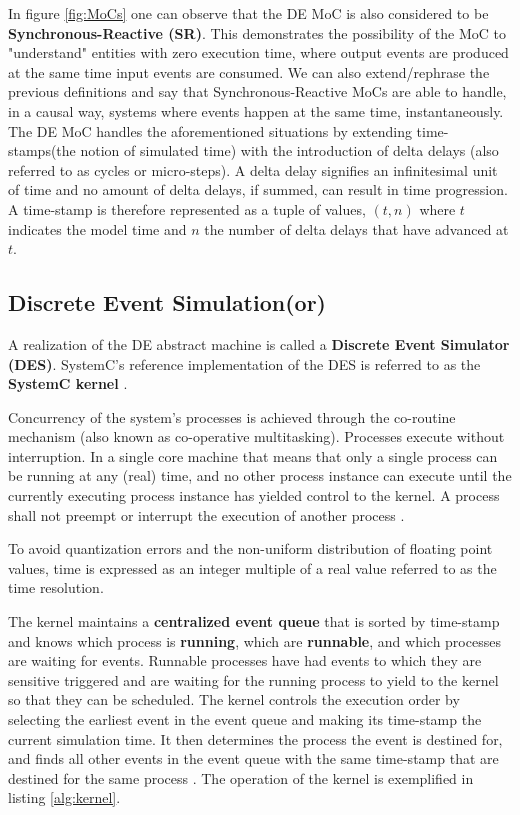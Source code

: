 \documentclass[12pt,twoside]{article}
\begin{document}
In figure \ref{fig:MoCs} one can observe that the DE MoC is also considered to be \textbf{Synchronous-Reactive (SR)}. 
This demonstrates the possibility of the MoC to "understand" entities with zero execution time, where output events are produced at the same time input events are consumed.
We can also extend/rephrase the previous definitions and say that Synchronous-Reactive MoCs are able to handle, in a causal way, systems where events happen at the same time, instantaneously.
The DE MoC handles the aforementioned situations by extending time-stamps(the notion of simulated time) with the introduction of delta delays (also referred to as cycles or micro-steps).
A delta delay signifies an infinitesimal unit of time and no amount of delta delays, if summed, can result in time progression.
A time-stamp is therefore represented as a tuple of values, $(t,n)$ where $t$ indicates the model time and $n$ the number of delta delays that have advanced at $t$.




\subsection{Discrete Event Simulation(or)}
\label{sec-4-3}
A realization of the DE abstract machine is called a \textbf{Discrete Event Simulator (DES)}.
SystemC's reference implementation of the DES is referred to as the \textbf{SystemC kernel} \cite{OpenSystemCInitiative2012}.

Concurrency of the system's processes is achieved through the co-routine mechanism (also known as co-operative multitasking). 
Processes execute without interruption. In a single core machine that means that only a single process can be running at any (real) time, 
and no other process instance can execute until the currently executing process instance has yielded control to the kernel.
A process shall not preempt or interrupt the execution of another process \cite{OpenSystemCInitiative2012}.

To avoid quantization errors and the non-uniform distribution of floating point values, time is expressed as an integer multiple of a real value referred to as the time resolution. 

The kernel maintains a \textbf{centralized event queue} that is sorted by time-stamp and knows which process is \textbf{running}, which are \textbf{runnable}, and which processes are waiting for events.
Runnable processes have had events to which they are sensitive triggered and are waiting for the running process to yield to the kernel so that they can be scheduled.
The kernel controls the execution order by selecting the earliest event in the event queue and making its time-stamp the current simulation time.
It then determines the process the event is destined for, and finds all other events in the event queue with the same time-stamp that are destined for the same process \cite{Black2010}.
The operation of the kernel is exemplified in listing \ref{alg:kernel}.
\end{document}
